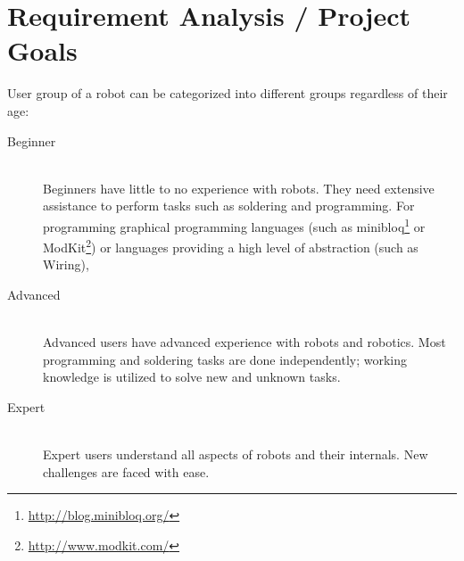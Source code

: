 \documentclass[11pt,a4paper]{article}
\begin{document}
\section{Requirement Analysis / Project Goals}
User group of a robot can be categorized into different groups regardless of their age:
\begin{description}
\item[Beginner] \hfill \\ Beginners have little to no experience with robots. They need extensive assistance to perform tasks such as soldering and programming. For programming graphical programming languages (such as minibloq\footnote{\url{http://blog.minibloq.org/}} or ModKit\footnote{\url{http://www.modkit.com/}}) or languages providing a high level of abstraction (such as Wiring), 
\item[Advanced] \hfill \\ Advanced users have advanced experience with robots and robotics. Most programming and soldering tasks are done independently; working knowledge is utilized to solve new and unknown tasks.  
\item[Expert] \hfill \\ Expert users understand all aspects of robots and their internals. New challenges are faced with ease.
\end{description}
\end{document}
